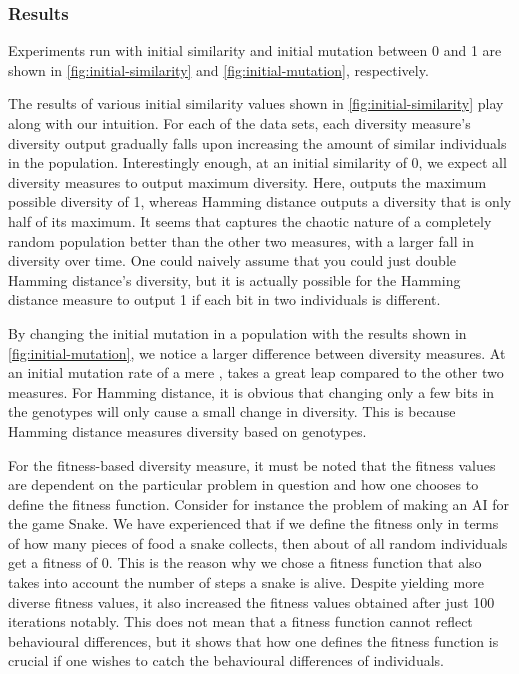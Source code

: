 \subsubsection{Results}
Experiments run with initial similarity and initial mutation between 0 and 1 are shown in \cref{fig:initial-similarity} and \cref{fig:initial-mutation}, respectively.
%

%
The results of various initial similarity values shown in \cref{fig:initial-similarity} play along with our intuition. For each of the data sets, each diversity measure's diversity output gradually falls upon increasing the amount of similar individuals in the population. Interestingly enough, at an initial similarity of 0, we expect all diversity measures to output maximum diversity. Here, \dia{} outputs the maximum possible diversity of 1, whereas Hamming distance outputs a diversity that is only half of its maximum. It seems that \dia{} captures the chaotic nature of a completely random population better than the other two measures, with a larger fall in diversity over time. One could naively assume that you could just double Hamming distance's diversity, but it is actually possible for the Hamming distance measure to output 1 if each bit in two individuals is different.



By changing the initial mutation in a population with the results shown in \cref{fig:initial-mutation}, we notice a larger difference between diversity measures. At an initial mutation rate of a mere , \dia{} takes a great leap compared to the other two measures. For Hamming distance, it is obvious that changing only a few bits in the genotypes will only cause a small change in diversity. This is because Hamming distance measures diversity based on genotypes.

For the fitness-based diversity measure, it must be noted that the fitness values are dependent on the particular problem in question and how one chooses to define the fitness function. Consider for instance the problem of making an AI for the game Snake. We have experienced that if we define the fitness only in terms of how many pieces of food a snake collects, then about  of all random individuals get a fitness of 0. This is the reason why we chose a fitness function that also takes into account the number of steps a snake is alive. Despite yielding more diverse fitness values, it also increased the fitness values obtained after just 100 iterations notably. This does not mean that a fitness function cannot reflect behavioural differences, but it shows that how one defines the fitness function is crucial if one wishes to catch the behavioural differences of individuals.
